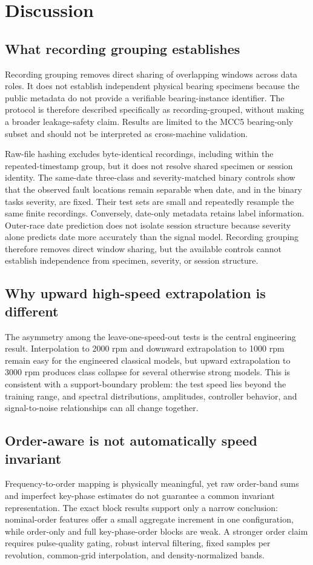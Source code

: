\documentclass[machines,article,submit,oneauthor]{Definitions/mdpi}
\begin{document}
\section{Discussion}
\subsection{What recording grouping establishes}
Recording grouping removes direct sharing of overlapping windows across data roles. It does not establish independent physical bearing specimens because the public metadata do not provide a verifiable bearing-instance identifier. The protocol is therefore described specifically as recording-grouped, without making a broader leakage-safety claim. Results are limited to the MCC5 bearing-only subset and should not be interpreted as cross-machine validation.

Raw-file hashing excludes byte-identical recordings, including within the repeated-timestamp group, but it does not resolve shared specimen or session identity. The same-date three-class and severity-matched binary controls show that the observed fault locations remain separable when date, and in the binary tasks severity, are fixed. Their test sets are small and repeatedly resample the same finite recordings. Conversely, date-only metadata retains label information. Outer-race date prediction does not isolate session structure because severity alone predicts date more accurately than the signal model. Recording grouping therefore removes direct window sharing, but the available controls cannot establish independence from specimen, severity, or session structure.

\subsection{Why upward high-speed extrapolation is different}
The asymmetry among the leave-one-speed-out tests is the central engineering result. Interpolation to 2000 rpm and downward extrapolation to 1000 rpm remain easy for the engineered classical models, but upward extrapolation to 3000 rpm produces class collapse for several otherwise strong models. This is consistent with a support-boundary problem: the test speed lies beyond the training range, and spectral distributions, amplitudes, controller behavior, and signal-to-noise relationships can all change together.

\subsection{Order-aware is not automatically speed invariant}
Frequency-to-order mapping is physically meaningful, yet raw order-band sums and imperfect key-phase estimates do not guarantee a common invariant representation. The exact block results support only a narrow conclusion: nominal-order features offer a small aggregate increment in one configuration, while order-only and full key-phase-order blocks are weak. A stronger order claim requires pulse-quality gating, robust interval filtering, fixed samples per revolution, common-grid interpolation, and density-normalized bands.
\end{document}
